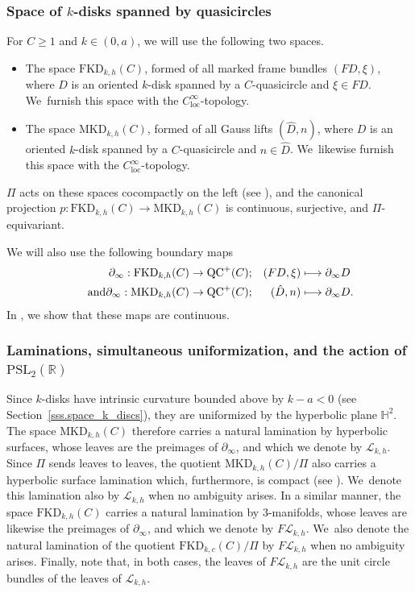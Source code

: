 \documentclass[11pt]{article}
\newcommand\mto{\mathchoice{\longmapsto}{\mapsto}{\mapsto}{\mapsto}}
\newcommand{\kdisk}{$k$\nobreakdash-disk\xspace}
\newcommand{\kdisks}{$k$\nobreakdash-disks\xspace}
\theoremstyle{plain}
\theoremstyle{definition}
\newcommand\PSL{\mathrm{PSL}_2(\mathbb{R})}
\newcommand\Hd{\mathbb{H}^2}
\newcommand{\cL}{{\mathcal L}}
\newcommand{\loc}{\mathrm{loc}}
\newcommand{\QC}{\mathrm{QC}}
\newcommand{\MKD}{\mathrm{MKD}}
\newcommand{\FKD}{\mathrm{FKD}}
\newcommand{\bord}{\partial_{\infty}}
\begin{document}
\subsubsection{Space of \kdisks spanned by quasicircles}
For $C\geq 1$ and $k\in(0,a)$, we will use the following two spaces.
\begin{itemize}
\item The space $\FKD_{k,h}(C)$, formed of all marked frame bundles $(FD,\xi)$, where $D$ is an oriented \kdisk spanned by a $C$-quasicircle and $\xi\in FD$. We~furnish this space with the $C^\infty_\loc$-topology.
\item The space $\MKD_{k,h}(C)$, formed of all Gauss lifts $(\hat D,n)$, where $D$ is an oriented \kdisk spanned by a $C$-quasicircle and $n\in\hat D$. We~likewise furnish this space with the $C^\infty_\loc$-topology.
\end{itemize}
$\Pi$ acts on these spaces cocompactly on the left (see \cite{ALS,LabourieGAFA}), and the canonical projection $p:\FKD_{k,h}(C)\to\MKD_{k,h}(C)$ is continuous, surjective, and $\Pi$-equivariant.

We will also use the following boundary maps
\begin{align*}
\bord:\FKD_{k,h}(C)&\to\QC^+(C);&(FD,\xi)&\mto\bord D\\
\tag*{and}\bord:\MKD_{k,h}(C)&\to\QC^+(C);&(\hat{D},n)&\mto\bord D.
\end{align*}
In \cite{ALS}, we show that these maps are continuous.

\subsubsection{Laminations, simultaneous uniformization, and the action of $\PSL$}
\label{sssec:LaminationsSimultaneousUniformization}
Since \kdisks have intrinsic curvature bounded above by $k-a<0$ (see Section~\ref{sss.space_k_discs}), they are uniformized by the hyperbolic plane $\Hd$. The space $\MKD_{k,h}(C)$ therefore carries a natural lamination by hyperbolic surfaces, whose leaves are the preimages of $\bord$, and which we denote by $\cL_{k,h}$. Since $\Pi$ sends leaves to leaves, the quotient $\MKD_{k,h}(C)/\Pi$ also carries a hyperbolic surface lamination which, furthermore, is compact (see \cite{LabourieGAFA}). We~denote this lamination also by $\cL_{k,h}$ when no ambiguity arises. In a similar manner, the space $\FKD_{k,h}(C)$ carries a natural lamination by $3$\nobreakdash-manifolds, whose leaves are likewise the preimages of $\bord$, and which we denote by $F\cL_{k,h}$. We~also denote the natural lamination of the quotient $\FKD_{k,c}(C)/\Pi$ by $F\cL_{k,h}$ when no ambiguity arises. Finally, note that, in both cases, the leaves of $F\cL_{k,h}$ are the unit circle bundles of the leaves of $\cL_{k,h}$.
\end{document}
